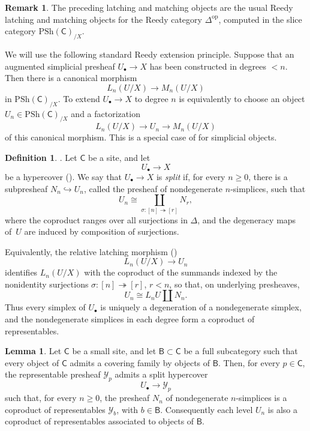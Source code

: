 \documentclass{amsart}
\newcommand{\cat}[1]{\mathsf{#1}}
\newcommand{\psh}{\mathrm{PSh}}
\renewcommand{\op}{\mathrm{op}}
\newcommand{\Yo}{\mathscr{Y}}
\theoremstyle{definition}
\newtheorem{definition}[equation]{Definition}
\newtheorem{lemma}[equation]{Lemma}
\newtheorem{remark}[equation]{Remark}
\numberwithin{equation}{subsection}
\numberwithin{subsubsection}{subsection}
\begin{document}
\begin{remark}\label{rem:reedy.factorization.for.hypercovers}
  The preceding latching and matching objects are the usual Reedy latching
  and matching objects for the Reedy category \(\Delta^{\op}\), computed in
  the slice category \(\psh(\cat{C})_{/X}\).

  We will use the following standard Reedy extension principle. Suppose that
  an augmented simplicial presheaf \(U_{\bullet}\to X\) has been constructed
  in degrees \(<n\). Then there is a canonical morphism
  \[
    L_n(U/X)\longrightarrow M_n(U/X)
  \]
  in \(\psh(\cat{C})_{/X}\). To extend \(U_{\bullet}\to X\) to degree \(n\)
  is equivalently to choose an object \(U_n\in\psh(\cat{C})_{/X}\) and a
  factorization
  \[
    L_n(U/X)\longrightarrow U_n\longrightarrow M_n(U/X)
  \]
  of this canonical morphism. This is a special case of
  \cite[Remark~15.2.10]{Hir03} for simplicial objects.
\end{remark}

\begin{definition}\label{def:split.hypercover}
  \textnormal{\cite[Definition~4.8]{DHI04}}.
  Let \(\cat{C}\) be a site, and let
  \[
    U_{\bullet}\longrightarrow X
  \]
  be a hypercover (). We say that \(U_{\bullet}\to X\) is
  \emph{split} if, for every
  \(n\geq0\), there is a subpresheaf \(N_n\hookrightarrow U_n\), called the
  presheaf of nondegenerate \(n\)-simplices, such that
  \[
    U_n\cong
    \coprod_{\sigma:[n]\twoheadrightarrow[r]}N_r,
  \]
  where the coproduct ranges over all surjections in \(\Delta\), and the
  degeneracy maps of~$U$ are induced by composition of surjections.

  Equivalently, the relative latching morphism
  ()
  \[
    L_n(U/X)\longrightarrow U_n
  \]
  identifies \(L_n(U/X)\) with the coproduct of the summands indexed by the
  nonidentity surjections \(\sigma:[n]\twoheadrightarrow[r]\), \(r<n\), so
  that, on underlying presheaves,
  \[
    U_n\cong L_nU\amalg N_n.
  \]
  Thus every simplex of \(U_{\bullet}\) is uniquely a degeneration of a
  nondegenerate simplex, and the nondegenerate simplices in each degree form
  a coproduct of representables.

\end{definition}

\begin{lemma}\label{lem:split.hypercovers.from.basis}
  Let \(\cat{C}\) be a small site, and let
  \(\cat{B}\subset\cat{C}\) be a full subcategory such that every object of
  \(\cat{C}\) admits a covering family by objects of \(\cat{B}\). Then, for
  every \(p\in\cat{C}\), the representable presheaf \(\Yo_p\) admits a split
  hypercover
  \[
    U_{\bullet}\longrightarrow \Yo_p
  \]
  such that, for every \(n\geq 0\), the presheaf \(N_n\) of nondegenerate
  \(n\)-simplices is a coproduct of representables \(\Yo_b\), with
  \(b\in\cat{B}\). Consequently each level \(U_n\) is also a coproduct of
  representables associated to objects of \(\cat{B}\).
\end{lemma}
\end{document}
